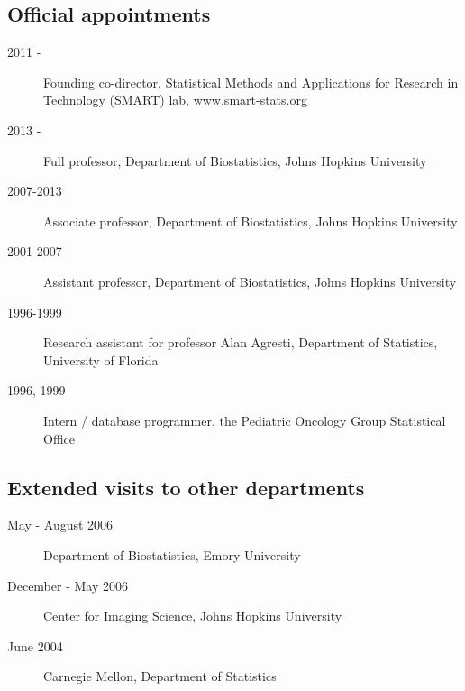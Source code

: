 \documentclass[12pt]{article}
\begin{document}
\subsection*{Official appointments}
\begin{description}
\item[\textnormal{2011} - ] Founding co-director, Statistical Methods and Applications for Research in Technology (SMART) lab, www.smart-stats.org
\item[\textnormal{2013} - ] Full professor, Department of Biostatistics, Johns Hopkins University
\item[\textnormal{2007-2013}] Associate professor, Department of Biostatistics, Johns Hopkins University
\item[\textnormal{2001-2007}] Assistant professor, Department of Biostatistics, Johns Hopkins University
\item[\textnormal{1996-1999}] Research assistant for professor Alan Agresti, Department of Statistics, University of Florida
\item[\textnormal{1996, 1999}] Intern /  database programmer, the Pediatric Oncology Group Statistical Office
\end{description}

\subsection*{Extended visits to other departments}
\begin{description}
\item[\textnormal{May - August 2006}] Department of Biostatistics, Emory University
\item[\textnormal{December - May 2006}] Center for Imaging Science, Johns Hopkins University
\item[\textnormal{June 2004}] Carnegie Mellon, Department of Statistics 
\end{description}
\end{document}
